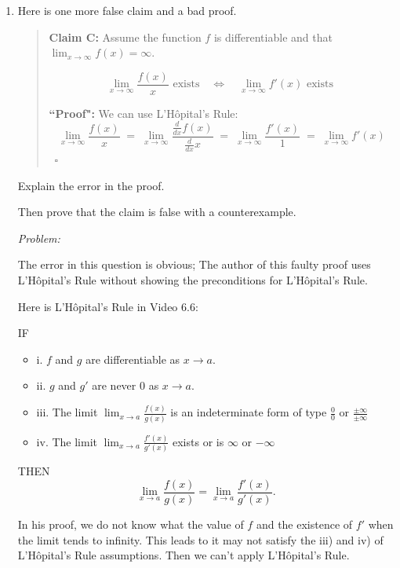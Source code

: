 \documentclass[12pt]{exam}
\newcommand {\DS} [1] {${\displaystyle #1}$}
\newcommand{\vv}{\vspace{.1cm}}
\begin{document}
\begin{enumerate}
\begin{enumerate}
		\newpage
		
		\item  Here is one more false claim and a bad proof.
			\begin{quotation}
				\noindent
				{\bf Claim C:} Assume the function $f$ is differentiable and that \DS{\lim_{x \to \infty} f(x) = \infty}.
				
				$$  \lim_{x \to \infty} \frac{f(x)}{x} \mbox{ exists} \quad \iff \quad \lim_{x \to \infty} f'(x) \mbox{ exists } $$
				
				
				\noindent
				{\bf ``Proof":}  We can use L'H\^{o}pital's Rule:
					$$
						\lim_{x \to \infty} \frac{f(x)}{x} \; = \; \lim_{x \to \infty} \frac{\frac{d}{dx} f(x)}{\frac{d}{dx} x} 
							\; = \; \lim_{x \to \infty} \frac{f'(x)}{1} \; = \; \lim_{x \to \infty} f'(x)
					$$
					\ \hfill $\square$
			\end{quotation}
			Explain the  error in the proof.
			
			Then prove that the claim is false with a counterexample.
			
			\vv
			
			\emph{Problem:}
			
			\vv
			
			The error in this question is obvious; The author of this faulty proof uses L'H\^{o}pital's Rule without showing the preconditions for L'H\^{o}pital's Rule.
			
			Here is L'H\^{o}pital's Rule in Video 6.6:
			
			IF
			\begin{itemize}
			    \item i. $f$ and $g$ are differentiable as $x \to a$.
			    \item ii. $g$ and $g'$ are never $0$ as $x \to a$.
			    \item iii. The limit $\lim_{x \to a}\frac{f(x)}{g(x)}$ is an indeterminate form of type $\frac{0}{0}$ or $\frac{\pm\infty}{\pm\infty}$
			    \item iv. The limit $\lim_{x \to a}\frac{f'(x)}{g'(x)}$ exists or is $\infty$ or $-\infty$
			    
			\end{itemize}
			THEN
			$$
			    \lim_{x \to a}\frac{f(x)}{g(x)}=\lim_{x \to a}\frac{f'(x)}{g'(x)}.
			$$
			
			In his proof, we do not know what the value of $f$ and the existence of $f'$  when the limit tends to infinity. This leads to it may not satisfy the iii) and iv) of L'H\^{o}pital's Rule assumptions. Then we can't apply L'H\^{o}pital's Rule.
			

\end{enumerate}
\end{enumerate}
\end{document}
